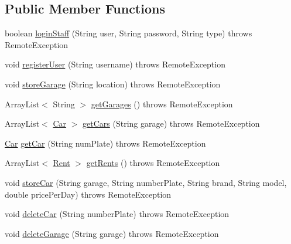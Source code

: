 \subsection*{Public Member Functions}
\begin{DoxyCompactItemize}
\item 
boolean \mbox{\hyperlink{interfacecarrenting_1_1server_1_1_i_car_renting_affb9a568ddfe7cd2712f367c38e0e432}{login\+Staff}} (String user, String password, String type)  throws Remote\+Exception
\item 
void \mbox{\hyperlink{interfacecarrenting_1_1server_1_1_i_car_renting_a2cc1d35537a158a56fcc8315ab18af77}{register\+User}} (String username)  throws Remote\+Exception
\item 
void \mbox{\hyperlink{interfacecarrenting_1_1server_1_1_i_car_renting_a2a6b576363c023ef94615f58d7305222}{store\+Garage}} (String location)  throws Remote\+Exception
\item 
Array\+List$<$ String $>$ \mbox{\hyperlink{interfacecarrenting_1_1server_1_1_i_car_renting_a3192598ccc120a739ca168df03c23681}{get\+Garages}} ()  throws Remote\+Exception
\item 
Array\+List$<$ \mbox{\hyperlink{classcarrenting_1_1server_1_1jdo_1_1_car}{Car}} $>$ \mbox{\hyperlink{interfacecarrenting_1_1server_1_1_i_car_renting_aeaa26a483ce5e53faab84b0e3be0f7c9}{get\+Cars}} (String garage)  throws Remote\+Exception
\item 
\mbox{\hyperlink{classcarrenting_1_1server_1_1jdo_1_1_car}{Car}} \mbox{\hyperlink{interfacecarrenting_1_1server_1_1_i_car_renting_aa4d89c769e75b73df2a85805ea90bb49}{get\+Car}} (String num\+Plate)  throws Remote\+Exception
\item 
Array\+List$<$ \mbox{\hyperlink{classcarrenting_1_1server_1_1jdo_1_1_rent}{Rent}} $>$ \mbox{\hyperlink{interfacecarrenting_1_1server_1_1_i_car_renting_a314ae8f7230cca5469932eb3034d5c49}{get\+Rents}} ()  throws Remote\+Exception
\item 
void \mbox{\hyperlink{interfacecarrenting_1_1server_1_1_i_car_renting_a45afd537059a13920f8ed9f91865b871}{store\+Car}} (String garage, String number\+Plate, String brand, String model, double price\+Per\+Day)  throws Remote\+Exception
\item 
void \mbox{\hyperlink{interfacecarrenting_1_1server_1_1_i_car_renting_ac3730576a7df8ac11f89d1cc9ad4158a}{delete\+Car}} (String number\+Plate)  throws Remote\+Exception
\item 
void \mbox{\hyperlink{interfacecarrenting_1_1server_1_1_i_car_renting_a962ebc71ee856ffdda808876d3a26e79}{delete\+Garage}} (String garage)  throws Remote\+Exception
\end{DoxyCompactItemize}


